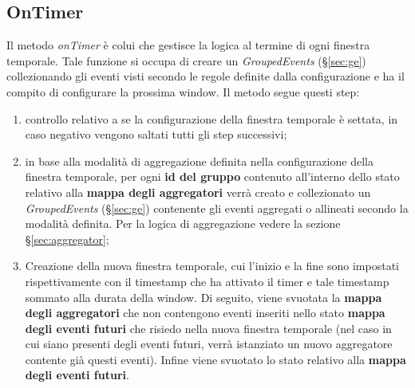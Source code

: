 \subsection{OnTimer}\label{sec:on-timer-windowing}
Il metodo \textit{onTimer} è colui che gestisce la logica al termine di ogni finestra temporale. Tale funzione si occupa di creare un \textit{GroupedEvents} (\S\ref{sec:ge}) collezionando gli eventi visti secondo le regole definite dalla configurazione e ha il compito di configurare la prossima window. Il metodo segue questi step:
\begin{enumerate}
	\item{controllo relativo a se la configurazione della finestra temporale è settata, in caso negativo vengono saltati tutti gli step successivi;}
	\item{in base alla modalità di aggregazione definita nella configurazione della finestra temporale, per ogni \textbf{id del gruppo} contenuto all'interno dello stato relativo alla \textbf{mappa degli aggregatori} verrà creato e collezionato un \textit{GroupedEvents} (\S\ref{sec:ge}) contenente gli eventi aggregati o allineati secondo la modalità definita. Per la logica di aggregazione vedere la sezione \S\ref{sec:aggregator};}
	\item{Creazione della nuova finestra temporale, cui l'inizio e la fine sono impostati rispettivamente con il \gls{timestamp} che ha attivato il timer e tale \gls{timestamp} sommato alla durata della window. Di seguito, viene svuotata la \textbf{mappa degli aggregatori} che non contengono eventi inseriti nello stato \textbf{mappa degli eventi futuri} che risiedo nella nuova finestra temporale (nel caso in cui siano presenti degli eventi futuri, verrà istanziato un nuovo aggregatore contente già questi eventi). Infine viene svuotato lo stato relativo alla \textbf{mappa degli eventi futuri}.
	}
\end{enumerate}

